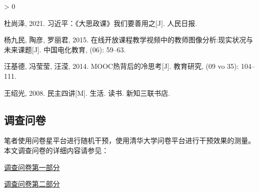\documentclass[
  12pt,
]{ctexart}
\newlength{\cslhangindent}
\newenvironment{CSLReferences}[2] %
 {%
  \setlength{\parindent}{0pt}
  \ifodd #1 \everypar{\setlength{\hangindent}{\cslhangindent}}\ignorespaces\fi
  \ifnum #2 > 0
  \setlength{\parskip}{#2\baselineskip}
  \fi
 }%
 {}
\begin{document}
\begin{CSLReferences}{1}{0}
\leavevmode\hypertarget{ref-DuShangZe2021}{}%
杜尚泽, 2021. 习近平：{《大思政课》}我们要善用之{[}J{]}. 人民日报.

\leavevmode\hypertarget{ref-YangJiuMinEtAl2015}{}%
杨九民, 陶彦, 罗丽君, 2015. {在线开放课程教学视频中的教师图像分析:现实状况与未来课题}{[}J{]}. 中国电化教育, (06): 59--63.

\leavevmode\hypertarget{ref-WangJiDeEtAl2014}{}%
汪基德, 冯莹莹, 汪滢, 2014. {MOOC热背后的冷思考}{[}J{]}. 教育研究, (09 vo 35): 104--111.

\leavevmode\hypertarget{ref-WangShaoGuang2008}{}%
王绍光, 2008. {民主四讲}{[}M{]}. {生活. 读书. 新知三联书店}.

\end{CSLReferences}

\break

\hypertarget{appendix-supplementary-materials}{%
\appendix}


\hypertarget{ux8c03ux67e5ux95eeux5377}{%
\subsection{调查问卷}\label{ux8c03ux67e5ux95eeux5377}}

笔者使用问卷星平台进行随机干预，使用清华大学问卷平台进行干预效果的测量。本文调查问卷的详细内容请参见：

\href{https://civtemoe.wjx.cn/vj/wdJmKjm.aspx}{调查问卷第一部分}

\href{http://wenjuan.tsinghua.edu.cn/s/vem6Jj/}{调查问卷第二部分}
\end{document}
